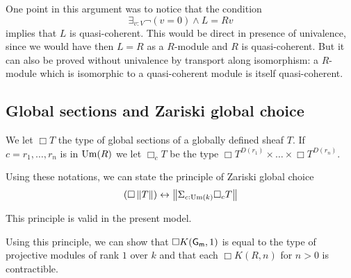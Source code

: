 One point in this argument was to notice that the condition
$$
\exists_{v:V}\neg (v = 0)\wedge L = R v
$$
implies that $L$ is quasi-coherent. This would be direct in presence of univalence, since we would have then $L = R$ as a $R$-module
and $R$ is quasi-coherent. But it can also be proved without univalence by transport along isomorphism: a $R$-module which is
isomorphic to a quasi-coherent module is itself quasi-coherent.


\subsection{Global sections and Zariski global choice}

We let $\Box T$ the type of global sections of a globally defined sheaf $T$.
If $c = r_1,\dots,r_n$ is in $\mathrm{Um}(R)$ we let $\Box_c T$ be the type $\Box T^{D(r_1)}\times\dots\times\Box T^{D(r_n)}$.

Using these notations, we can state the principle of Zariski global choice
$$
(\Box \left\lVert T \right\rVert)\leftrightarrow \left\lVert \Sigma_{c:\mathrm{Um}(k)}\Box_c T \right\rVert
$$

This principle is valid in the present model.

Using this principle, we can show that $\Box K(\mathsf{G_m},1)$ is equal to the type of projective modules of rank $1$ over $k$
and that each $\Box K(R,n)$ for $n>0$ is contractible.
                                                                                  

 
